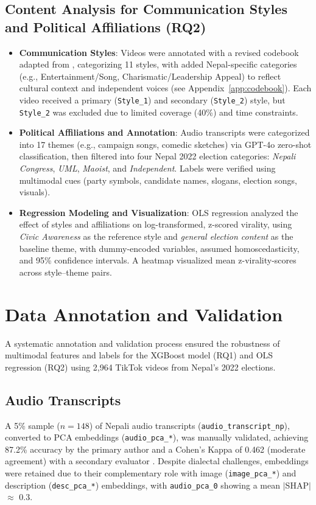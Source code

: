 \documentclass[12pt,a4paper]{report}
\begin{document}
\subsection{Content Analysis for Communication Styles and Political Affiliations (RQ2)}
\begin{itemize}
    \item \textbf{Communication Styles}: Videos were annotated with a revised codebook adapted from \parencite{schellewald2021communicative, umansky2023dances}, categorizing 11 styles, with added Nepal-specific categories (e.g., Entertainment/Song, Charismatic/Leadership Appeal) to reflect cultural context and independent voices \parencite{DW2022NepalElections} (see Appendix~\ref{app:codebook}). Each video received a primary (\texttt{Style\_1}) and secondary (\texttt{Style\_2}) style, but \texttt{Style\_2} was excluded due to limited coverage (40\%) and time constraints.
    
    \item \textbf{Political Affiliations and Annotation}: Audio transcripts were categorized into 17 themes (e.g., campaign songs, comedic sketches) via GPT-4o zero-shot classification, then filtered into four Nepal 2022 election categories: \textit{Nepali Congress}, \textit{UML}, \textit{Maoist}, and \textit{Independent}. Labels were verified using multimodal cues (party symbols, candidate names, slogans, election songs, visuals).
    
    \item \textbf{Regression Modeling and Visualization}: OLS regression analyzed the effect of styles and affiliations on log-transformed, z-scored virality, using \textit{Civic Awareness} as the reference style and \textit{general election content} as the baseline theme, with dummy-encoded variables, assumed homoscedasticity, and 95\% confidence intervals. A heatmap visualized mean z-virality-scores across style–theme pairs.
\end{itemize}

\section{Data Annotation and Validation}
\label{sec:data_annotation}

A systematic annotation and validation process ensured the robustness of multimodal features and labels for the XGBoost model (RQ1) and OLS regression (RQ2) using 2,964 TikTok videos from Nepal’s 2022 elections.

\subsection{Audio Transcripts}
A 5\% sample (\(n=148\)) of Nepali audio transcripts (\texttt{audio\_transcript\_np}), converted to PCA embeddings (\texttt{audio\_pca\_*}), was manually validated, achieving 87.2\% accuracy by the primary author and a Cohen’s Kappa of 0.462 (moderate agreement) with a secondary evaluator \parencite{landis1977measurement}. Despite dialectal challenges, embeddings were retained due to their complementary role with image (\texttt{image\_pca\_*}) and description (\texttt{desc\_pca\_*}) embeddings, with \texttt{audio\_pca\_0} showing a mean $|$SHAP$|$ $\approx$ 0.3.
\end{document}
